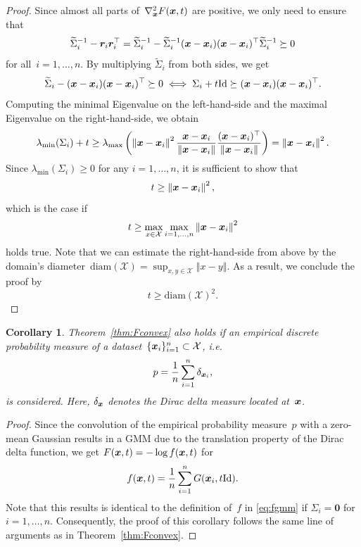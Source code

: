 \documentclass{article} %
\theoremstyle{plain}
\newtheorem{corollary}[theorem]{Corollary}
\theoremstyle{definition}
\theoremstyle{remark}
\newcommand{\X}{\mathcal{X}}
\newcommand{\id}{\mathrm{Id}}
\newcommand{\norm}[1]{\left\Vert#1\right\Vert}
\newcommand{\diameter}{\mathrm{diam}}
\begin{document}
\begin{proof}
Since almost all parts of~$\nabla_{\bm{x}}^2 F({\bm{x}}, t)$ are positive, we only need to ensure that
\[
\widetilde{\Sigma}_i^{-1} - {\bm{r}}_i{\bm{r}}_i^\top = \widetilde{\Sigma}_i^{-1} - \widetilde{\Sigma}_i^{-1} ({\bm{x}}-{\bm{x}}_i)({\bm{x}}-{\bm{x}}_i)^\top \widetilde{\Sigma}_i^{-1} \succeq 0
\]
for all~$i=1,\ldots,n$.
By multiplying $\widetilde{\Sigma}_i$ from both sides, we get
\[
\widetilde{\Sigma}_i - (\vx-\vx_i)(\vx-\vx_i)^\top \succeq 0 \iff \Sigma_i + t\id \succeq (\vx-\vx_i)(\vx-\vx_i)^\top.
\]
Computing the minimal Eigenvalue on the left-hand-side and the maximal Eigenvalue on the right-hand-side, we obtain
\[
\lambda_\mathrm{min}(\Sigma_i) + t \geq \lambda_\mathrm{max}\left(\norm{\vx-\vx_i}^2 \frac{\vx-\vx_i}{\norm{\vx-\vx_i}}\frac{(\vx-\vx_i)^\top}{\norm{\vx-\vx_i}}\right) = \norm{\vx-\vx_i}^2.
\]
Since $\lambda_\mathrm{min}(\Sigma_i)\geq0$ for any $i=1,\ldots,n$, it is sufficient to show that
\[
t\geq \norm{\vx-\vx_i}^2,
\]
which is the case if 
\[
t\geq \max_{x\in\X}\max_{i=1,\ldots,n} \norm{\vx-\vx_i}^2
\]
holds true.
Note that we can estimate the right-hand-side from above by the domain's diameter~$\diameter(\X)=\sup_{x,y\in\X}\norm{x-y}$.
As a result, we conclude the proof by
\[
t\geq \diameter(\X)^2.
\]
\end{proof}

\begin{corollary}
Theorem~\ref{thm:Fconvex} also holds if an empirical discrete probability measure of a dataset~$\{\vx_i\}_{i=1}^n\subset\X$, i.e.
\[
p = \frac{1}{n}\sum_{i=1}^n\delta_{{\bm{x}}_i},
\]
is considered.
Here, $\delta_{{\bm{x}}}$ denotes the Dirac delta measure located at~${\bm{x}}$.
\end{corollary}

\begin{proof}
Since the convolution of the empirical probability measure~$p$ with a zero-mean Gaussian results in a GMM due to the translation property of the Dirac delta function, we get $F({\bm{x}},t) = -\log f({\bm{x}},t)$ for
\[
f(\vx,t)=\frac{1}{n}\sum_{i=1}^n G(\vx_i, t\id).
\]
Note that this results is identical to the definition of~$f$ in \eqref{eq:fgmm} if $\Sigma_i=\bm{0}$ for $i=1,\ldots,n$.
Consequently, the proof of this corollary follows the same line of arguments as in Theorem~\ref{thm:Fconvex}.
\end{proof}
\end{document}
